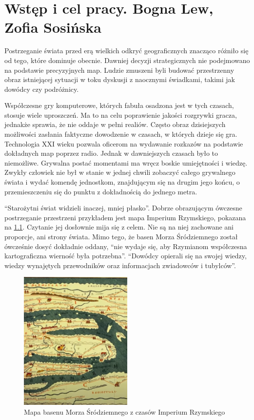 \chapter{Wstęp i cel pracy. Bogna Lew, Zofia Sosińska}\label{chap:introduction}

Postrzeganie świata przed erą wielkich odkryć geograficznych znacząco różniło się od tego, które dominuje obecnie. Dawniej
decyzji strategicznych nie podejmowano na podstawie precyzyjnych map. Ludzie zmuszeni byli  budować  przestrzenny obraz
istniejącej sytuacji  w toku dyskusji z naocznymi świadkami, takimi jak dowódcy czy podróżnicy.

Współczesne gry komputerowe, których fabuła osadzona jest w tych czasach, stosuje wiele uproszczeń. Ma to na celu poprawienie jakości
rozgrywki gracza, jednakże sprawia, że nie oddaje w pełni realiów. Często obraz dzisiejszych możliwości zasłania faktyczne dowodzenie
w czasach, w których dzieje się gra. Technologia XXI wieku pozwala oficerom na wydawanie rozkazów na podstawie dokładnych map poprzez radio.
Jednak w dawniejszych czasach było to niemożliwe. Grywalna postać momentami ma wręcz boskie umiejętności i wiedzę. Zwykły człowiek nie był w
stanie w jednej chwili zobaczyć całego grywalnego świata i wydać komendę jednostkom, znajdującym się na drugim jego końcu, o przemieszczeniu
się do punktu z dokładnością do jednego metra.

“Starożytni świat widzieli inaczej, mniej płasko”\cite{gbobrektvgry}. Dobrze obrazującym ówczesne postrzeganie przestrzeni przykładem jest mapa Imperium Rzymskiego, 
pokazana na \ref{fig:mapaIR}. Czytanie jej dosłownie mija się z celem. Nie są na niej zachowane ani proporcje, ani strony świata. Mimo tego, że 
basen Morza Śródziemnego został ówcześnie dosyć dokładnie oddany, “nie wydaje się, aby Rzymianom współczesna kartograficzna wierność była potrzebna”\cite{gbobrektvgry}. 
“Dowódcy opierali się na swojej wiedzy, wiedzy wynajętych przewodników oraz informacjach zwiadowców i tubylców”\cite{gbobrektvgry}.
\begin{figure}[htbp]
    \centering
    \includegraphics[width=0.5\textwidth]{images/mapaIR.png}
    \caption{Mapa basenu Morza Śródziemnego z czasów Imperium Rzymskiego}\label{fig:mapaIR}
\end{figure}

